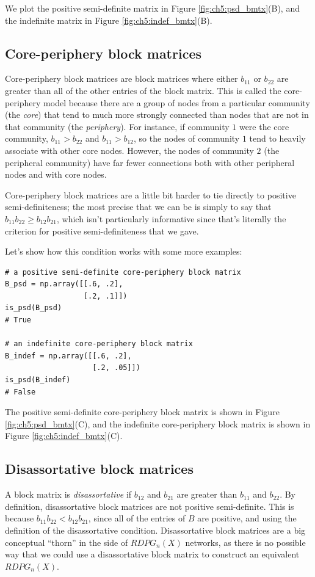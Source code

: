 We plot the positive semi-definite matrix in Figure \ref{fig:ch5:psd_bmtx}(B), and the indefinite matrix in Figure \ref{fig:ch5:indef_bmtx}(B).

\subsection{Core-periphery block matrices}

Core-periphery block matrices are block matrices where either $b_{11}$ or $b_{22}$ are greater than all of the other entries of the block matrix. This is called the core-periphery model because there are a group of nodes from a particular community (the \textit{core}) that tend to much more strongly connected than nodes that are not in that community (the \textit{periphery}). For instance, if community $1$ were the core community, $b_{11} > b_{22}$ and $b_{11} > b_{12}$, so the nodes of community $1$ tend to heavily associate with other core nodes. However, the nodes of community $2$ (the peripheral community) have far fewer connections both with other peripheral nodes and with core nodes. 

Core-periphery block matrices are a little bit harder to tie directly to positive semi-definiteness; the most precise that we can be is simply to say that $b_{11}b_{22} \geq b_{12}b_{21}$, which isn't particularly informative since that's literally the criterion for positive semi-definiteness that we gave.

Let's show how this condition works with some more examples:


\begin{lstlisting}[style=python]
# a positive semi-definite core-periphery block matrix
B_psd = np.array([[.6, .2], 
                  [.2, .1]])
is_psd(B_psd)
# True

# an indefinite core-periphery block matrix
B_indef = np.array([[.6, .2], 
                    [.2, .05]])
is_psd(B_indef)
# False
\end{lstlisting}

The positive semi-definite core-periphery block matrix is shown in Figure \ref{fig:ch5:psd_bmtx}(C), and the indefinite core-periphery block matrix is shown in Figure \ref{fig:ch5:indef_bmtx}(C).

\subsection{Disassortative block matrices}

A block matrix is \textit{disassortative} if $b_{12}$ and $b_{21}$ are greater than $b_{11}$ and $b_{22}$. By definition, disassortative block matrices are not positive semi-definite. This is because $b_{11}b_{22} < b_{12}b_{21}$, since all of the entries of $B$ are positive, and using the definition of the disassortative condition. Disassortative block matrices are a big conceptual ``thorn'' in the side of $RDPG_n(X)$ networks, as there is no possible way that we could use a disassortative block matrix to construct an equivalent $RDPG_n(X)$. 

